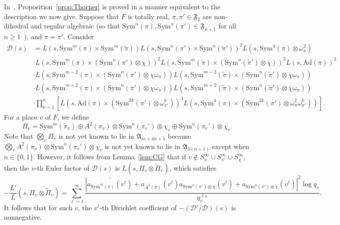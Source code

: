 \documentclass[11pt]{amsart}
\theoremstyle{remark}
\newcommand{\Sym}{\mathrm{Sym}}
\renewcommand{\tilde}{\widetilde}
\numberwithin{equation}{section}
\begin{document}
In~\cite{Thorner_Siegel}, Proposition~\ref{prop:Thorner} is proved in a manner equivalent to the description we now give.  Suppose that $F$ is totally real, $\pi,\pi'\in\mathfrak{F}_2$ are non-dihedral and regular algebraic (so that $\Sym^n(\pi),\Sym^n(\pi')\in\mathfrak{F}_{n+1}$ for all $n\geq 1$~\cite{NewtonThorne3}), and $\pi\not\sim\pi'$.  Consider
\begin{equation}
\label{eqn:JT_Sym}
\begin{aligned}
\mathcal{D}(s)&=L(s,\mathrm{Sym}^{m}(\pi)\times\mathrm{Sym}^m(\widetilde{\pi})) L(s,\mathrm{Sym}^{n}(\pi')\times\mathrm{Sym}^n(\widetilde{\pi}'))^2 L(s,\mathrm{Sym}^4(\pi)\otimes\overline{\omega}_{\pi}^{2})\\
&\cdot L(s,\mathrm{Sym}^{m}(\pi)\times(\mathrm{Sym}^{n}(\pi')\otimes\chi))^2 L(s,\mathrm{Sym}^m(\widetilde{\pi})\times(\mathrm{Sym}^n(\widetilde{\pi}')\otimes\overline{\chi}))^2 L(s,\mathrm{Ad}(\pi))^3\\
&\cdot L(s,\mathrm{Sym}^{m-2}(\pi)\times(\mathrm{Sym}^{n}(\pi')\otimes\chi\omega_{\pi})) L(s,\mathrm{Sym}^{m-2}(\widetilde{\pi})\times(\mathrm{Sym}^{n}(\widetilde{\pi}')\otimes\overline{\chi}\overline{\omega}_{\pi})) \\
&\cdot L(s,\mathrm{Sym}^{m+2}(\pi)\times(\mathrm{Sym}^{n}(\pi')\otimes\chi\overline{\omega}_{\pi})) L(s,\mathrm{Sym}^{m+2}(\widetilde{\pi})\times(\mathrm{Sym}^n(\widetilde{\pi}')\otimes\overline{\chi}\omega_{\pi}))\\
&\cdot \prod_{k=1}^n [L(s,\mathrm{Ad}(\pi)\times(\mathrm{Sym}^{2k}(\pi')\otimes\overline{\omega}_{\pi'}^{k}))^3 L(s,\mathrm{Sym}^4(\pi)\times(\mathrm{Sym}^{2k}(\pi')\otimes \overline{\omega}_{\pi}^{2}\overline{\omega}_{\pi'}^{k}))].
\end{aligned}
\end{equation}
For a place $v$ of $F$, we define
\[
\Pi_v = \Sym^m(\tilde{\pi}_v)\oplus A^2(\pi_v)\otimes\Sym^n(\pi_v')\otimes\chi_v\oplus \Sym^n(\pi_v')\otimes\chi_v.
\]
Note that $\bigotimes_v \Pi_v$ is not yet known to lie in $\mathfrak{A}_{m+4n+5}$ because $\bigotimes_v A^2(\pi_v)\otimes\Sym^n(\pi_v')\otimes\chi_v$ is not yet known to lie in $\mathfrak{A}_{3(n+1)}$ except when $n\in\{0,1\}$.  However, it follows from Lemma~\ref{lem:CG} that if $v\notin S_{\pi}^{\infty}\cup S_{\pi'}^{\infty}\cup S_{\chi}^{\infty}$, then the $v$-th Euler factor of $\mathcal{D}(s)$ is $L(s,\Pi_v\otimes\tilde{\Pi}_v)$, which satisfies
\[
-\frac{L'}{L}(s,\Pi_v\otimes\tilde{\Pi}_v)=\sum_{\ell=1}^{\infty}\frac{|\overline{a_{\Sym^m(\pi)}(v^{\ell})}+a_{A^2(\pi)}(v^{\ell})a_{\Sym^n(\pi')\otimes\chi}(v^{\ell})+a_{\Sym^n(\pi')\otimes\chi}(v^{\ell})|^2\log q_v}{q_v^{\ell s}}.
\]
It follows that for such $v$, the $v^{\ell}$-th Dirichlet coefficient of $-(\mathcal{D}'/\mathcal{D})(s)$ is nonnegative.
\end{document}

